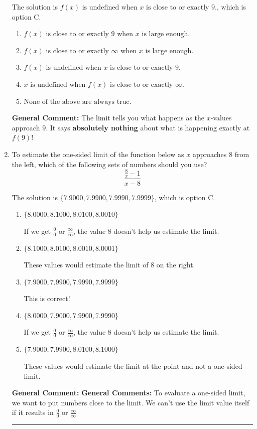 \documentclass{extbook}[14pt]
\newcommand{\litem}[1]{\item #1

\rule{\textwidth}{0.4pt}}
\begin{document}
\begin{enumerate}
{The solution is \( f(x) \text{ is undefined when } x \text{ is close to or exactly } 9. \), which is option C.\begin{enumerate}[label=\Alph*.]
\item \( f(x) \text{ is close to or exactly } 9 \text{ when } x \text{ is large enough}. \)


\item \( f(x) \text{ is close to or exactly } \infty \text{ when } x \text{ is large enough}. \)


\item \( f(x) \text{ is undefined when } x \text{ is close to or exactly } 9. \)


\item \( x \text{ is undefined when } f(x) \text{ is close to or exactly } \infty. \)


\item \( \text{None of the above are always true.} \)


\end{enumerate}

\textbf{General Comment:} The limit tells you what happens as the $x$-values approach $9$. It says \textbf{absolutely nothing} about what is happening exactly at $f(9)$!
}
\litem{
To estimate the one-sided limit of the function below as $x$ approaches 8 from the left, which of the following sets of numbers should you use?
\[ \frac{\frac{8}{x} - 1}{x - 8} \]

The solution is \( \{ 7.9000, 7.9900, 7.9990, 7.9999 \} \), which is option C.\begin{enumerate}[label=\Alph*.]
\item \( \{ 8.0000, 8.1000, 8.0100, 8.0010 \} \)

If we get $\frac{0}{0}$ or $\frac{\infty}{\infty}$, the value 8 doesn't help us estimate the limit.
\item \( \{ 8.1000, 8.0100, 8.0010, 8.0001 \} \)

These values would estimate the limit of 8 on the right.
\item \( \{ 7.9000, 7.9900, 7.9990, 7.9999 \} \)

This is correct!
\item \( \{ 8.0000, 7.9000, 7.9900, 7.9990 \} \)

If we get $\frac{0}{0}$ or $\frac{\infty}{\infty}$, the value 8 doesn't help us estimate the limit.
\item \( \{ 7.9000, 7.9900, 8.0100, 8.1000 \} \)

These values would estimate the limit at the point and not a one-sided limit.
\end{enumerate}

\textbf{General Comment:} \textbf{General Comments:} To evaluate a one-sided limit, we want to put numbers close to the limit. We can't use the limit value itself if it results in $\frac{0}{0}$ or $\frac{\infty}{\infty}$
}
\end{enumerate}
\end{document}
